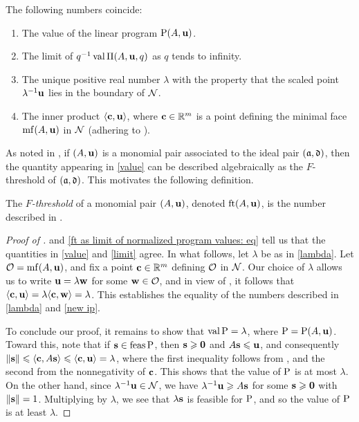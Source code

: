 \documentclass{amsart}
\begin{document}
\begin{proposition}
   \label{FT descriptions: P}
   The following numbers coincide\textup:
   \begin{enumerate}[$(1)$]
      \item\label{value} The value of the linear program $\mathrm{P}(A, \mathbf{u})$.
      \item\label{limit} The limit of $q^{-1}\operatorname{val} \Pi(A,\mathbf{u},q)$ as $q$ tends to infinity.
      \item\label{lambda} The unique positive real number $\lambda$ with the property that the scaled point $\lambda^{-1}\mathbf{u}$ lies in the boundary of $\mathcal{N}$.
      \item\label{new ip} The inner product $\langle \mathbf{c}, \mathbf{u} \rangle$, where $\mathbf{c} \in \mathbb{R}^m$ is a point defining the minimal face $\operatorname{mf}(A, \mathbf{u})$ in $\mathcal{N}$ \textup(adhering to \textup).
   \end{enumerate}
\end{proposition}

As noted in , if $(A,\mathbf{u})$ is a monomial pair associated to the ideal pair $(\mathfrak{a},\mathfrak{d})$, then the quantity appearing in \ref{value} can be described algebraically as the $F$-threshold of $(\mathfrak{a},\mathfrak{d})$.
This motivates the following definition.

\begin{definition}
\label{FT: D}
   The \emph{$F$-threshold} of a monomial pair $(A, \mathbf{u})$, denoted $\operatorname{ft}(A, \mathbf{u})$, is the number described in .
\end{definition}

\begin{proof}[Proof of ]
    and \eqref{ft as limit of normalized program values: eq} tell us that the quantities in \ref{value} and \ref{limit} agree.  In what follows, let $\lambda$ be as in \ref{lambda}.
   Let $\mathcal{O} = \operatorname{mf}(A,\mathbf{u})$, and fix a point $\mathbf{c} \in \mathbb{R}^m$ defining $\mathcal{O}$ in $\mathcal{N}$.
   Our choice of $\lambda$ allows us to write $\mathbf{u} = \lambda \mathbf{w}$ for some $\mathbf{w} \in \mathcal{O}$, and in view of , it follows that $\langle \mathbf{c}, \mathbf{u} \rangle = \lambda \langle \mathbf{c}, \mathbf{w} \rangle = \lambda$.
   This establishes the equality of the numbers described in \ref{lambda} and \ref{new ip}.

   To conclude our proof, it remains to show that $\operatorname{val} \mathrm{P} = \lambda$, where $\mathrm{P} = \mathrm{P}(A, \mathbf{u})$.
   Toward this, note that if $\mathbf{s} \in \operatorname{feas} \mathrm{P}$, then $\mathbf{s}\geqslant \mathbf{0}$ and $A \mathbf{s} \leqslant \mathbf{u}$, and consequently $\| \mathbf{s} \| \leqslant \langle \mathbf{c}, A \mathbf{s} \rangle \leqslant \langle \mathbf{c}, \mathbf{u} \rangle = \lambda$, where the first inequality follows from , and the second from the nonnegativity of $\mathbf{c}$.
   This shows that the value of $\mathrm{P}$ is at most $\lambda$.
   On the other hand, since $\lambda^{-1}\mathbf{u} \in \mathcal{N}$, we have $\lambda^{-1}\mathbf{u} \geqslant A\mathbf{s}$ for some $\mathbf{s} \geqslant \mathbf{0}$ with $\| \mathbf{s} \| = 1$.
   Multiplying by $\lambda$, we see that  $\lambda\mathbf{s}$ is feasible for $\mathrm{P}$, and so the value of $\mathrm{P}$ is at least $\lambda$.
\end{proof}
\end{document}

